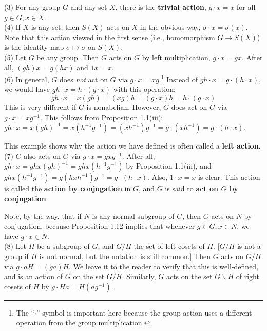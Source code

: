 \documentclass[leqno]{book}
\begin{document}
(3) For any group $G$ and any set $X$, there is the \textbf{trivial action}, $g\cdot x=x$ for all $g\in G,x\in X$.\\

(4) If $X$ is any set, then $S(X)$ acts on $X$ in the obvious way, $\sigma\cdot x=\sigma(x)$.  Note that this action viewed in the first sense (i.e., homomorphism $G\to S(X)$) is the identity map $\sigma\mapsto\sigma$ on $S(X)$.\\

(5) Let $G$ be any group.  Then $G$ acts on $G$ by left multiplication, $g\cdot x=gx$.  After all, $(gh)x=g(hx)$ and $1x=x$.\\

(6) In general, $G$ does \emph{not} act on $G$ via $g\cdot x=xg$.\footnote{The ``$\cdot$'' symbol is important here because the group action uses a different operation from the group multiplication.}  Instead of $gh\cdot x=g\cdot(h\cdot x)$, we would have $gh\cdot x=h\cdot(g\cdot x)$ with this operation:
$$gh\cdot x=x(gh)=(xg)h=(g\cdot x)h=h\cdot(g\cdot x)$$
This is very different if $G$ is nonabelian.  However, $G$ does act on $G$ via $g\cdot x=xg^{-1}$.  This follows from Proposition 1.1(iii): $gh\cdot x=x(gh)^{-1}=x(h^{-1}g^{-1})=(xh^{-1})g^{-1}=g\cdot(xh^{-1})=g\cdot(h\cdot x)$.

This example shows why the action we have defined is often called a \textbf{left action}.\\

(7) $G$ also acts on $G$ via $g\cdot x=gxg^{-1}$.  After all, $gh\cdot x=ghx(gh)^{-1}=ghx(h^{-1}g^{-1})$ by Proposition 1.1(iii), and $ghx(h^{-1}g^{-1})=g(hxh^{-1})g^{-1}=g\cdot(h\cdot x)$.  Also, $1\cdot x=x$ is clear.  This action is called the \textbf{action by conjugation} in $G$, and $G$ is said to \textbf{act on $G$ by conjugation}.

Note, by the way, that if $N$ is any normal subgroup of $G$, then $G$ acts on $N$ by conjugation, because Proposition 1.12 implies that whenever $g\in G,x\in N$, we have $g\cdot x\in N$.\\

(8) Let $H$ be a subgroup of $G$, and $G/H$ the set of left cosets of $H$.  [$G/H$ is not a group if $H$ is not normal, but the notation is still common.]  Then $G$ acts on $G/H$ via $g\cdot aH=(ga)H$.  We leave it to the reader to verify that this is well-defined, and is an action of $G$ on the set $G/H$.  Similarly, $G$ acts on the set $G\backslash H$ of right cosets of $H$ by $g\cdot Ha=H(ag^{-1})$.\\
\end{document}
